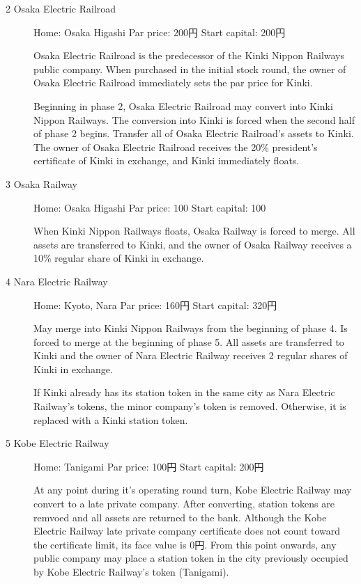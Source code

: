 \documentclass{article}
\begin{document}
\begin{CJK}{UTF8}{min}
\begin{multicols}{2}
\begin{description}
\item[2 Osaka Electric Railroad] \hfill
Home: Osaka Higashi \hfill Par price: 200円 \hfill Start capital: 200円

Osaka Electric Railroad is the predecessor of the Kinki Nippon
Railways public company. When purchased in the initial stock round,
the owner of Osaka Electric Railroad immediately sets the par price
for Kinki.

Beginning in phase 2, Osaka Electric Railroad may convert into Kinki
Nippon Railways. The conversion into Kinki is forced when the second
half of phase 2 begins. Transfer all of Osaka Electric Railroad's
assets to Kinki. The owner of Osaka Electric Railroad receives the
20\% president's certificate of Kinki in exchange, and Kinki
immediately floats.

\item[3 Osaka Railway] \hfill
Home: Osaka Higashi \hfill Par price: 100 \hfill Start capital: 100

When Kinki Nippon Railways floats, Osaka Railway is forced to
merge. All assets are transferred to Kinki, and the owner of Osaka
Railway receives a 10\% regular share of Kinki in exchange.

\item[4 Nara Electric Railway] \hfill
Home: Kyoto, Nara \hfill Par price: 160円 \hfill Start capital: 320円

May merge into Kinki Nippon Railways from the beginning of phase 4. Is
forced to merge at the beginning of phase 5. All assets are
transferred to Kinki and the owner of Nara Electric Railway receives 2
regular shares of Kinki in exchange.

If Kinki already has its station token in the same city as Nara
Electric Railway's tokens, the minor company's token is
removed. Otherwise, it is replaced with a Kinki station token.

\item[5 Kobe Electric Railway]\hfill

  Home: Tanigami \hfill Par price: 100円 \hfill Start capital: 200円

  At any point during it's operating round turn, Kobe Electric Railway
  may convert to a late private company. After converting, station
  tokens are remvoed and all assets are returned to the bank. Although
  the Kobe Electric Railway late private company certificate does not
  count toward the certificate limit, its face value is 0円. From
  this point onwards, any public company may place a station token in
  the city previously occupied by Kobe Electric Railway's token
  (Tanigami).
\end{description}


\end{multicols}
\end{CJK}
\end{document}
